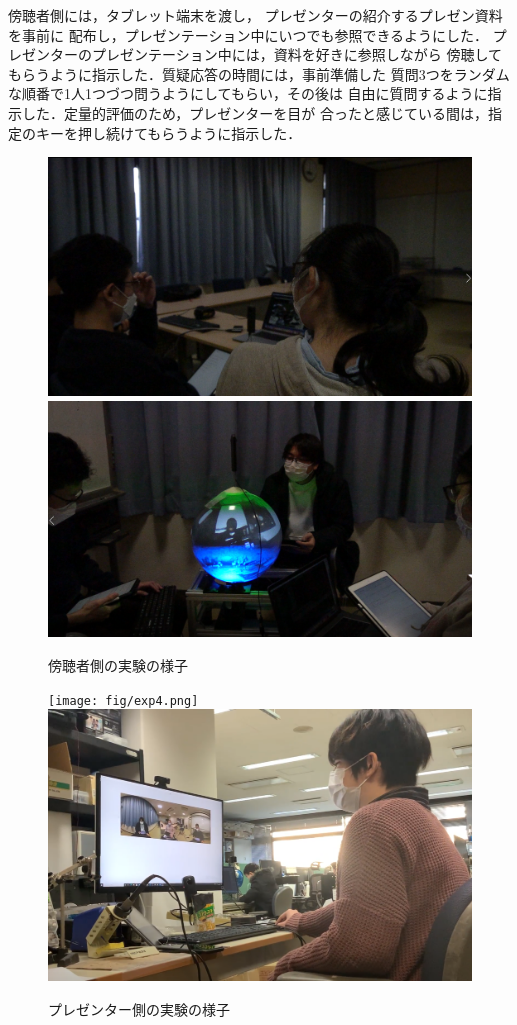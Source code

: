 傍聴者側には，タブレット端末を渡し，
プレゼンターの紹介するプレゼン資料を事前に
配布し，プレゼンテーション中にいつでも参照できるようにした．
プレゼンターのプレゼンテーション中には，資料を好きに参照しながら
傍聴してもらうように指示した．質疑応答の時間には，事前準備した
質問3つをランダムな順番で1人1つづつ問うようにしてもらい，その後は
自由に質問するように指示した．定量的評価のため，プレゼンターを目が
合ったと感じている間は，指定のキーを押し続けてもらうように指示した．

\begin{figure}[tp]
    \centering
    \includegraphics[scale=0.4]{fig/exp1.png}
    \includegraphics[scale=0.4]{fig/exp2.png}
    \caption{傍聴者側の実験の様子}
\end{figure}

\begin{figure}[tp]
    \centering
    \texttt{[image: fig/exp4.png]}
    \includegraphics[scale=0.3]{fig/exp3.png}
    \caption{プレゼンター側の実験の様子}
\end{figure}